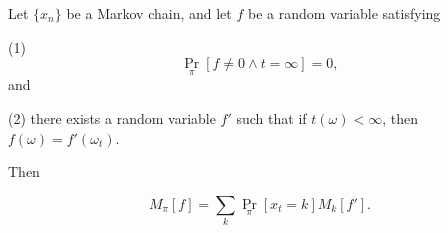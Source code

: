 Let $\{x_n\}$ be a Markov chain, and let $f$ be a random variable satisfying

(1) $$\Pr_{\pi}[f \neq 0 \land t = \infty] = 0,$$ and

(2) there exists a random variable $f'$ such that if $t(\omega) < \infty$, then $f(\omega) = f'(\omega_t)$.

Then

$$M_{\pi}[f] = \sum_{k} \Pr_{\pi}[x_t = k] M_k[f'].$$
